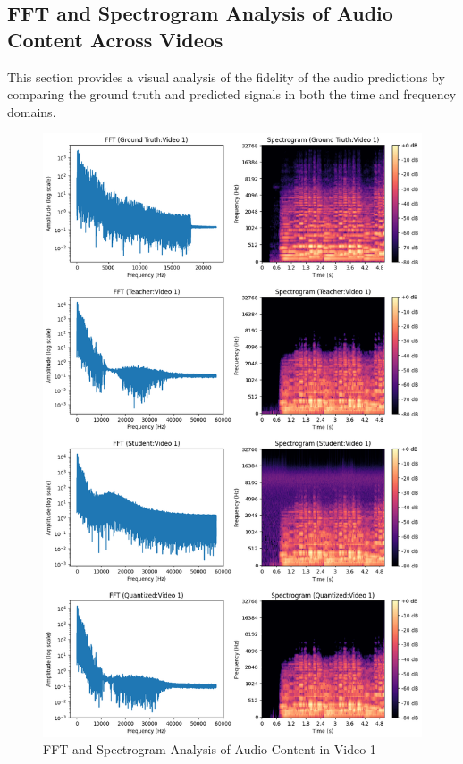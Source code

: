 \documentclass{ioereport}
\begin{document}
\subsection{FFT and Spectrogram Analysis of Audio Content Across Videos}
This section provides a visual analysis of the fidelity of the audio predictions by comparing the ground truth and predicted signals in both the time and frequency domains.

\begin{figure}[H]
    \centering
    \includegraphics[width=0.8\linewidth]{assets/quantization/fft_spectrogram_Video1.png}
    \caption{FFT and Spectrogram Analysis of Audio Content in Video 1}
    \label{fig:fft-spec-v1}
\end{figure}
\end{document}
